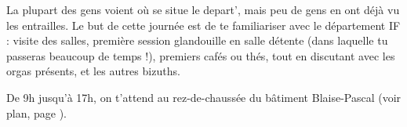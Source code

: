 La plupart des gens voient où se situe le depart', mais peu de gens en ont déjà
vu les entrailles. Le but de cette journée est de te familiariser avec le
département IF : visite des salles, première session glandouille en salle
détente (dans laquelle tu passeras beaucoup de temps !), premiers cafés ou
thés, tout en discutant avec les orgas présents, et les autres bizuths.

De 9h jusqu'à 17h, on t'attend au rez-de-chaussée du bâtiment Blaise-Pascal
(voir plan, page \pageref{plan}).
